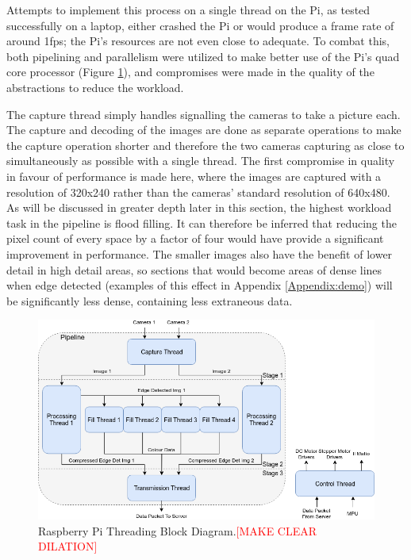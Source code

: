 Attempts to implement this process on a single thread on the Pi, as tested successfully on a laptop, either crashed the Pi or would produce a frame rate of around 1fps; the Pi's resources are not even close to adequate. To combat this, both pipelining and parallelism were utilized to make better use of the Pi's quad core processor (Figure \ref{fig:threads}), and compromises were made in the quality of the abstractions to reduce the workload.

The capture thread simply handles signalling the cameras to take a picture each. The capture and decoding of the images are done as separate operations to make the capture operation shorter and therefore the two cameras capturing as close to simultaneously as possible with a single thread. The first compromise in quality in favour of performance is made here, where the images are captured with a resolution of 320x240 rather than the cameras' standard resolution of 640x480. As will be discussed in greater depth later in this section, the highest workload task in the pipeline is flood filling. It can therefore be inferred that reducing the pixel count of every space by a factor of four would have provide a significant improvement in performance. The smaller images also have the benefit of lower detail in high detail areas, so sections that would become areas of dense lines when edge detected (examples of this effect in Appendix \ref{Appendix:demo}) will be significantly less dense, containing less extraneous data.

\begin{figure}[H]
    \begin{center}
      \includegraphics[width=1\textwidth]{Figures/Threads.png}
      \caption[Raspberry Pi Threading Block Diagram]{Raspberry Pi Threading Block Diagram.\textcolor{red}{[MAKE CLEAR DILATION]}}
      \label{fig:threads}
    \end{center}
\end{figure}

